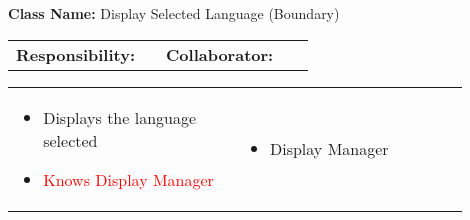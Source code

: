 \begin{cards}[]
    \textbf{Class Name:} Display Selected Language (Boundary)
    \tcbline
    \begin{tabular}{p{0.45\linewidth} | p{0.45\linewidth}}
        \textbf{Responsibility:}& 
        \textbf{Collaborator:}\\
    \end{tabular}
    \tcbline
    \begin{tabular}{p{0.45\linewidth} | p{0.45\linewidth}}
        \begin{itemize}
            \item Displays the language selected
            \item \textcolor{red}{Knows Display Manager}
        \end{itemize}
        &
        \begin{itemize}
            \item Display Manager
        \end{itemize}
    \end{tabular}
\end{cards}